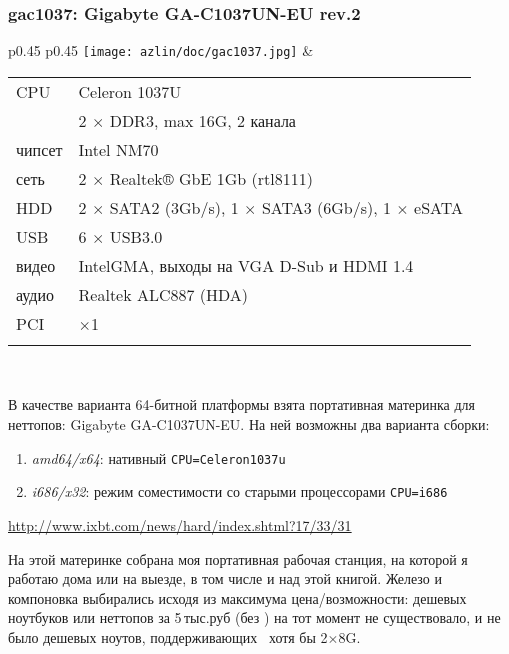 
\subsubsection{gac1037: Gigabyte GA-C1037UN-EU rev.2}

\begin{tabular}{p{0.45\textheight} p{0.45\textheight}}
\texttt{[image: azlin/doc/gac1037.jpg]} &
\begin{tabular}{l l}
CPU & Celeron 1037U \\
\ram & 2 $\times$ DDR3, max 16G, 2 канала \\
чипсет & Intel NM70 \\
сеть & 2 $\times$ Realtek® GbE 1Gb (rtl8111) \\
HDD & 2 $\times$ SATA2 (3Gb/s), 1 $\times$ SATA3 (6Gb/s), 1 $\times$ eSATA\\
USB & 6 $\times$ USB3.0 \\
видео & IntelGMA, выходы на VGA D-Sub и HDMI 1.4\\
аудио & Realtek ALC887 (HDA) \\
PCI & $\times$1 \\
&\\
\end{tabular}
\\
\end{tabular}

В качестве варианта 64-битной платформы взята портативная материнка для
неттопов: Gigabyte GA-C1037UN-EU. На ней возможны два варианта сборки:

\begin{enumerate}
  \item \emph{amd64/x64}: нативный \verb|CPU=Celeron1037u|
  \item \emph{i686/x32}: режим соместимости со старыми процессорами
  \verb|CPU=i686|
\end{enumerate}

\url{http://www.ixbt.com/news/hard/index.shtml?17/33/31}

\clearpage
На этой материнке собрана моя портативная рабочая станция, на которой я работаю
дома или на выезде, в том числе и над этой книгой. Железо и компоновка
выбирались исходя из максимума цена/возможности: дешевых ноутбуков или
неттопов за 5\,тыс.руб (без \ram) на тот момент не существовало, и не было
дешевых ноутов, поддерживающих \ram\ хотя бы 2$\times$8G.

